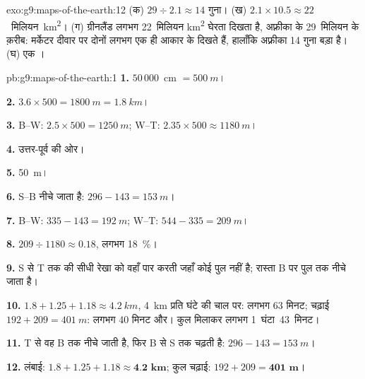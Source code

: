 \begin{solution}{exo:g9:maps-of-the-earth:12}
(क) $29 \div 2.1 \approx 14$ गुना। (ख) $2.1 \times 10.5 \approx
22$~मिलियन~\unit{km^2}। (ग) ग्रीनलैंड लगभग 22~मिलियन
\unit{km^2} घेरता दिखता है, अफ़्रीका के 29~मिलियन के क़रीब: मर्केटर दीवार  पर
दोनों लगभग एक ही आकार के दिखते हैं, हालाँकि अफ़्रीका 14 गुना बड़ा है। (घ) एक
।
\end{solution}

\begin{solution}{pb:g9:maps-of-the-earth:1}
\textbf{1.} $50\,000$~cm $= \qty{500}{m}$।

\textbf{2.} $3.6 \times 500 = \qty{1800}{m} = \qty{1.8}{km}$।

\textbf{3.} B--W: $2.5 \times 500 = \qty{1250}{m}$; W--T: $2.35 \times 500
\approx \qty{1180}{m}$।

\textbf{4.} उत्तर-पूर्व की ओर।

\textbf{5.} \qty{50}{m}।

\textbf{6.} S--B नीचे जाता है: $296 - 143 = \qty{153}{m}$।

\textbf{7.} B--W: $335 - 143 = \qty{192}{m}$; W--T: $544 - 335 =
\qty{209}{m}$।

\textbf{8.} $209 \div 1180 \approx 0.18$, लगभग \qty{18}{\%}।

\textbf{9.} S से T तक की सीधी रेखा  को वहाँ पार करती जहाँ कोई पुल नहीं है; रास्ता B पर
पुल तक नीचे जाता है।

\textbf{10.} $1.8 + 1.25 + 1.18 \approx \qty{4.2}{km}$, \qty{4}{km} प्रति घंटे की चाल पर: लगभग 63 मिनट; चढ़ाई $192 + 209 = \qty{401}{m}$: लगभग 40 मिनट
और। कुल मिलाकर लगभग 1~घंटा~43~मिनट।

\textbf{11.} T से वह B तक नीचे जाती है, फिर B से S तक चढ़ती है: $296 -
143 = \qty{153}{m}$।

\textbf{12.} लंबाई: $1.8 + 1.25 + 1.18 \approx \textbf{4.2 km}$; कुल
चढ़ाई: $192 + 209 = \textbf{401 m}$।
\end{solution}

